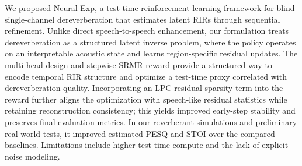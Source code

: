 \documentclass[10pt,conference]{IEEEtran}
\begin{document}
We proposed Neural-Exp, a test-time reinforcement learning framework for blind single-channel dereverberation that estimates latent RIRs through sequential refinement. Unlike direct speech-to-speech enhancement, our formulation treats dereverberation as a structured latent inverse problem, where the policy operates on an interpretable acoustic state and learns region-specific residual updates. The multi-head design and stepwise SRMR reward provide a structured way to encode temporal RIR structure and optimize a test-time proxy correlated with dereverberation quality. Incorporating an LPC residual sparsity term into the reward further aligns the optimization with speech-like residual statistics while retaining reconstruction consistency; this yields improved early-step stability and preserves final evaluation metrics. In our reverberant simulations and preliminary real-world tests, it improved estimated PESQ and STOI over the compared baselines. Limitations include higher test-time compute and the lack of explicit noise modeling.

\clearpage



\end{document}
